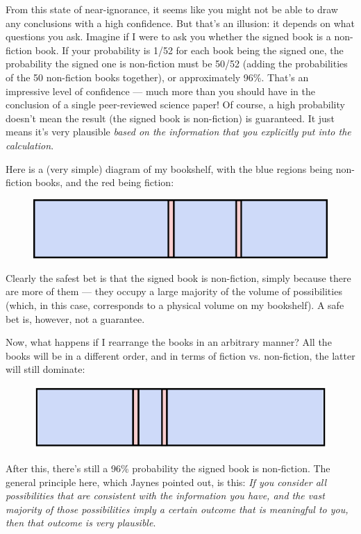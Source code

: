 \documentclass[a4paper, 12pt]{article}
\begin{document}
From this state of near-ignorance, it seems like you might not be able to draw
any conclusions with a high confidence. But that's an illusion: it depends on
what questions you ask. Imagine if I were to ask you whether the signed book
is a non-fiction book. If your probability is 1/52 for each book being the
signed one, the probability the signed one is non-fiction must be
50/52 (adding the probabilities of the 50 non-fiction books together), 
or approximately 96\%. That's an impressive level of confidence --- much more than you should have in the conclusion of a single peer-reviewed science paper!
Of course, a high probability doesn't mean the result (the signed book is
non-fiction) is guaranteed. It just means it's very plausible {\em based on the
information that you explicitly put into the calculation}.

Here is a (very simple) diagram of my bookshelf, with the blue regions
being non-fiction books, and the red being fiction:
\begin{figure}[ht!]
\centering
\includegraphics{bookshelf.png}
\end{figure}
Clearly the safest bet is that the signed book is non-fiction, simply because
there are more of them --- they occupy a large majority of the volume of
possibilities (which, in this case, corresponds to a physical volume on my
bookshelf). A safe bet is, however, not a guarantee.

Now, what happens if I rearrange the books in an arbitrary manner? All the books
will be in a different order, and in terms of fiction vs. non-fiction, the
latter will still dominate:
\begin{figure}[ht!]
\centering
\includegraphics[scale=0.61]{bookshelf2.png}
\end{figure}
After this, there's still a 96\% probability the signed book is non-fiction.
The general principle here, which Jaynes pointed out, is this:
{\em If you consider all possibilities that are consistent with
the information you have, and the vast majority of those possibilities
imply a certain outcome that is meaningful to you, then that outcome is very
plausible}.
\end{document}
